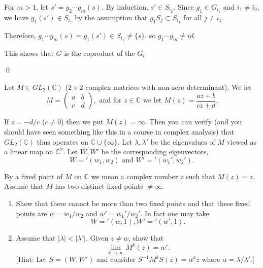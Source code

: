 For $m > 1$, let $s' = g_2 \cdots g_m(s)$. By induction, $s' \in S_{i_2}$. Since $g_1 \in G_{i_1}$ and $i_1 \neq i_2$, we have $g_1(s') \in S_{i_1}$ by the assumption that $g_1S_j \subset S_{i_1}$ for all $j \neq i_1$.

Therefore, $g_1 \cdots g_m(s) = g_1(s') \in S_{i_1} \neq \{s\}$, so $g_1 \cdots g_m \neq id$.

This shows that $G$ is the coproduct of the $G_i$.


\qed
\begin{problembox}
Let $M \in GL_2(\mathbb{C})$ ($2 \times 2$ complex matrices with non-zero determinant). We let
\[M = \begin{pmatrix}
a & b \\
c & d 
\end{pmatrix}, \text{ and for } z \in \mathbb{C} \text{ we let } M(z) = \frac{az + b}{cz + d}.\]

If $z = -d/c$ ($c \neq 0$) then we put $M(z) = \infty$. Then you can verify (and you should have seen something like this in a course in complex analysis) that $GL_2(\mathbb{C})$ thus operates on $\mathbb{C} \cup \{\infty\}$. Let $\lambda, \lambda'$ be the eigenvalues of $M$ viewed as a linear map on $\mathbb{C}^2$. Let $W, W'$ be the corresponding eigenvectors,
\[W = '(w_1, w_2) \text{ and } W' = '(w_1', w_2').\]

By a fixed point of $M$ on $\mathbb{C}$ we mean a complex number $z$ such that $M(z) = z$. Assume that $M$ has two distinct fixed points $\neq \infty$.
\begin{enumerate}[label=(\alph*)]
\item Show that there cannot be more than two fixed points and that these fixed points are $w = w_1 / w_2$ and $w' = w_1' / w_2'$. In fact one may take
\[ W = '(w, 1), W' = '(w', 1). \]
\item Assume that $|\lambda| < |\lambda'|$. Given $z \neq w$, show that
\[ \lim_{k \to \infty} M^k(z) = w'. \]
[Hint: Let $S = (W, W')$ and consider $S^{-1}M^kS(z) = \alpha^kz$ where $\alpha = \lambda / \lambda'$.]
\end{enumerate}
\end{problembox}

